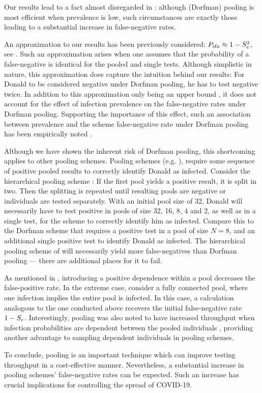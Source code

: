 \documentclass{article}
\begin{document}
Our results lead to a fact almost disregarded in
\cite{DorfmanYuvalDor}: although (Dorfman) pooling is most efficient
when prevalence is low, such circumstances are exactly those leading
to a substantial increase in false-negative rates.

An approximation to our results has been previously considered: $P_{\text{sfn}}
\approx 1-S_e^2 $, see \cite{Simplistic1, Simplistic2, Kim,
  OptimalDorfmanPool}. Such an approximation arises when one assumes
that the probability of a false-negative is identical for the pooled
and single tests. Although simplistic in nature, this approximation
does capture the intuition behind our results: For Donald to be
considered negative under Dorfman pooling, he has to test negative
twice. In addition to this approximation only being an upper bound
\cite{Simplistic2}, it does not account for the effect of infection
prevalence on the false-negative rates under Dorfman
pooling. Supporting the importance of this effect, such an association
between prevalence and the scheme false-negative rate under Dorfman
pooling has been empirically noted \cite{DorfmanYuvalDor}.

Although we have shown the inherent risk of Dorfman pooling, this
shortcoming applies to other pooling schemes. Pooling schemes
(e.g. \cite{MatrixPooling,Lion, Kim}), require some sequence of
positive pooled results to correctly identify Donald as
infected. Consider the hierarchical pooling scheme \cite{Lion, Kim}:
If the first pool yields a positive result, it is split in two. Then
the splitting is repeated until resulting pools are negative or
individuals are tested separately. With an initial pool size of 32,
Donald will necessarily have to test positive in pools of size 32, 16,
8, 4 and 2, as well as in a single test, for the scheme to correctly
identify him as infected. Compare this to the Dorfman scheme that
requires a positive test in a pool of size $N=8$, and an additional
single positive test to identify Donald as infected. The hierarchical
pooling scheme of \cite{Lion, Kim} will necessarily yield more
false-negatives than Dorfman pooling --- there are additional places
for it to fail.

As mentioned in \cite{DorfmanYuvalDor}, introducing a positive
dependence within a pool decreases the false-positive rate. In the
extreme case, consider a fully connected pool, where one infection
implies the entire pool is infected. In this case, a calculation
analogous to the one conducted above recovers the initial
false-negative rate $1-S_e$. Interestingly, pooling was also noted to
have increased throughput when infection probabilities are dependent
between the pooled individuals \cite{DorfmanYuvalDor}, providing
another advantage to sampling dependent individuals in pooling
schemes.

To conclude, pooling is an important technique which can improve
testing throughput in a cost-effective manner. Nevertheless, a
substantial increase in pooling schemes' false-negative rates can be
expected. Such an increase has crucial implications for controlling
the spread of COVID-19.






\end{document}
